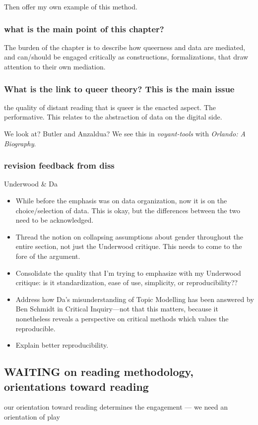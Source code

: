\documentclass[11pt]{article}
\begin{document}
Then offer my own example of this method.

\subsubsection{what is the main point of this chapter?}
\label{sec:org3447920}

The burden of the chapter is to describe how queerness and data are
mediated, and can/should be engaged critically as constructions,
formalizations, that draw attention to their own mediation.

\subsubsection{What is the link to queer theory? This is the main issue}
\label{sec:orga0fe284}
the quality of distant reading that is queer is the enacted
aspect. The performative. This relates to the abstraction of data on
the digital side.

We look at? Butler and Anzaldua?  We see this in \emph{voyant-tools} with
\emph{Orlando: A Biography}.

\subsubsection{revision feedback from diss}
\label{sec:org7144dce}

Underwood \& Da
\begin{itemize}
\item While before the emphasis was on data organization, now it is on the
choice/selection of data. This is okay, but the differences between
the two need to be acknowledged.
\item Thread the notion on collapsing assumptions about gender throughout
the entire section, not just the Underwood critique. This needs to
come to the fore of the argument.
\item Consolidate the quality that I'm trying to emphasize with my
Underwood critique: is it standardization, ease of use, simplicity,
or reproducibility??
\item Address how Da's misunderstanding of Topic Modelling has been
answered by Ben Schmidt in Critical Inquiry---not that this matters,
because it nonetheless reveals a perspective on critical methods
which values the reproducible.
\item Explain better reproducibility.
\end{itemize}


\subsection{{\bfseries\sffamily WAITING} on reading methodology, orientations toward reading}
\label{sec:orgc600db0}
our orientation toward reading determines the engagement --- we need
an orientation of play
\end{document}
